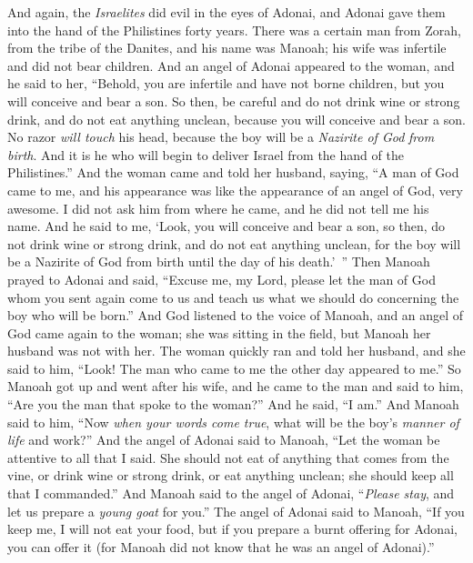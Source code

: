 \begin{biblechapter} %
 And again, the \textit{Israelites} did evil in the eyes of Adonai, and Adonai gave them into the hand of the Philistines forty years.
\verse There was a certain man from Zorah, from the tribe of the Danites, and his name was Manoah; his wife was infertile and did not bear children.
\verse And an angel of Adonai appeared to the woman, and he said to her, “Behold, you are infertile and have not borne children, but you will conceive and bear a son.
\verse So then, be careful and do not drink wine or strong drink, and do not eat anything unclean,
\verse because you will conceive and bear a son. No razor \textit{will touch} his head, because the boy will be a \textit{Nazirite of God} \textit{from birth}. And it is he who will begin to deliver Israel from the hand of the Philistines.”
\verse And the woman came and told her husband, saying, “A man of God came to me, and his appearance was like the appearance of an angel of God, very awesome. I did not ask him from where he came, and he did not tell me his name.
\verse And he said to me, ‘Look, you will conceive and bear a son, so then, do not drink wine or strong drink, and do not eat anything unclean, for the boy will be a Nazirite of God from birth until the day of his death.’ ”
\verse Then Manoah prayed to Adonai and said, “Excuse me, my Lord, please let the man of God whom you sent again come to us and teach us what we should do concerning the boy who will be born.”
\verse And God listened to the voice of Manoah, and an angel of God came again to the woman; she was sitting in the field, but Manoah her husband was not with her.
\verse The woman quickly ran and told her husband, and she said to him, “Look! The man who came to me the other day appeared to me.”
\verse So Manoah got up and went after his wife, and he came to the man and said to him, “Are you the man that spoke to the woman?” And he said, “I am.”
\verse And Manoah said to him, “Now \textit{when your words come true}, what will be the boy’s \textit{manner of life} and work?”
\verse And the angel of Adonai said to Manoah, “Let the woman be attentive to all that I said.
\verse She should not eat of anything that comes from the vine, or drink wine or strong drink, or eat anything unclean; she should keep all that I commanded.”
\verse And Manoah said to the angel of Adonai, “\textit{Please stay}, and let us prepare a \textit{young goat} for you.”
\verse The angel of Adonai said to Manoah, “If you keep me, I will not eat your food, but if you prepare a burnt offering for Adonai, you can offer it (for Manoah did not know that he was an angel of Adonai).”

\end{biblechapter}
